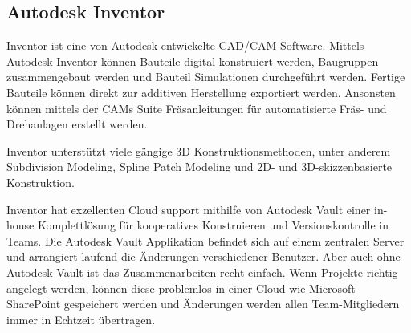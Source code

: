 \subsection{Autodesk Inventor}
\label{sec:inventor}

Inventor ist eine von Autodesk entwickelte \ac{CAD}/\acs{CAM} Software. Mittels Autodesk Inventor können Bauteile digital konstruiert werden, Baugruppen zusammengebaut werden und Bauteil Simulationen durchgeführt werden. Fertige Bauteile können direkt zur additiven Herstellung exportiert werden. Ansonsten können mittels der \acp{CAM} Suite Fräsanleitungen für automatisierte Fräs- und Drehanlagen erstellt werden.

Inventor unterstützt viele gängige 3D Konstruktionsmethoden, unter anderem Subdivision Modeling, Spline Patch Modeling und 2D- und 3D-skizzenbasierte Konstruktion.

Inventor hat exzellenten Cloud support mithilfe von Autodesk Vault einer in-house Komplettlösung für kooperatives Konstruieren und Versionskontrolle in Teams. Die Autodesk Vault Applikation befindet sich auf einem zentralen Server und arrangiert laufend die Änderungen verschiedener Benutzer. Aber auch ohne Autodesk Vault ist das Zusammenarbeiten recht einfach. Wenn Projekte richtig angelegt werden, können diese problemlos in einer Cloud wie Microsoft SharePoint gespeichert werden und Änderungen werden allen Team-Mitgliedern immer in Echtzeit übertragen.
